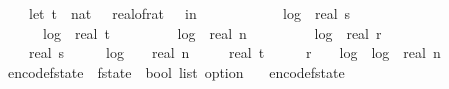 \begin{isabellebody}
\ \ \ \ let\ t\ {\isacharequal}{\kern0pt}\ nat\ {\isasymlceil}{}{}\ {\isacharslash}{\kern0pt}\ {\isacharparenleft}{\kern0pt}real{\isacharunderscore}{\kern0pt}of{\isacharunderscore}{\kern0pt}rat\ {\isasymdelta}{\isacharparenright}{\kern0pt}\ {\isasymrceil}\ in\isanewline
\ \ \ \ {}\ {\isacharplus}{\kern0pt}\isanewline
\ \ \ \ {}\ {\isacharasterisk}{\kern0pt}\ log\ {}\ {\isacharparenleft}{\kern0pt}real\ s\ {\isacharplus}{\kern0pt}\ {}{\isacharparenright}{\kern0pt}\ {\isacharplus}{\kern0pt}\isanewline
\ \ \ \ {}\ {\isacharasterisk}{\kern0pt}\ log\ {}\ {\isacharparenleft}{\kern0pt}real\ t\ {\isacharplus}{\kern0pt}\ {}{\isacharparenright}{\kern0pt}\ {\isacharplus}{\kern0pt}\isanewline
\ \ \ \ {}\ {\isacharasterisk}{\kern0pt}\ log\ {}\ {\isacharparenleft}{\kern0pt}real\ n\ {\isacharplus}{\kern0pt}\ {}{}{\isacharparenright}{\kern0pt}\ {\isacharplus}{\kern0pt}\isanewline
\ \ \ \ {}\ {\isacharasterisk}{\kern0pt}\ log\ {}\ {\isacharparenleft}{\kern0pt}real\ r\ {\isacharplus}{\kern0pt}\ {}{\isacharparenright}{\kern0pt}\ {\isacharplus}{\kern0pt}\isanewline
\ \ \ \ real\ s\ {\isacharasterisk}{\kern0pt}\ {\isacharparenleft}{\kern0pt}{}{}\ {\isacharplus}{\kern0pt}\ {}\ {\isacharasterisk}{\kern0pt}\ log\ {}\ {\isacharparenleft}{\kern0pt}{}{}\ {\isacharplus}{\kern0pt}\ real\ n{\isacharparenright}{\kern0pt}\ {\isacharplus}{\kern0pt}\isanewline
\ \ \ \ real\ t\ {\isacharasterisk}{\kern0pt}\ {\isacharparenleft}{\kern0pt}{}{}\ {\isacharplus}{\kern0pt}\ {}\ {\isacharasterisk}{\kern0pt}\ r\ {\isacharplus}{\kern0pt}\ {}\ {\isacharasterisk}{\kern0pt}\ log\ {}\ {\isacharparenleft}{\kern0pt}log\ {}\ {\isacharparenleft}{\kern0pt}real\ n\ {\isacharplus}{\kern0pt}\ {}{\isacharparenright}{\kern0pt}{\isacharparenright}{\kern0pt}{\isacharparenright}{\kern0pt}{\isacharparenright}{\kern0pt}{\isacharparenright}{\kern0pt}{\isachardoublequoteclose}\isanewline
\isanewline
{}\isamarkupfalse%
\ encode{\isacharunderscore}{\kern0pt}f{}{\isacharunderscore}{\kern0pt}state\ {\isacharcolon}{\kern0pt}{\isacharcolon}{\kern0pt}\ {\isachardoublequoteopen}f{}{\isacharunderscore}{\kern0pt}state\ {\isasymRightarrow}\ bool\ list\ option{\isachardoublequoteclose}\ \isanewline
\ \ {\isachardoublequoteopen}encode{\isacharunderscore}{\kern0pt}f{}{\isacharunderscore}{\kern0pt}state\ {\isacharequal}{\kern0pt}\ \isanewline

\end{isabellebody}
